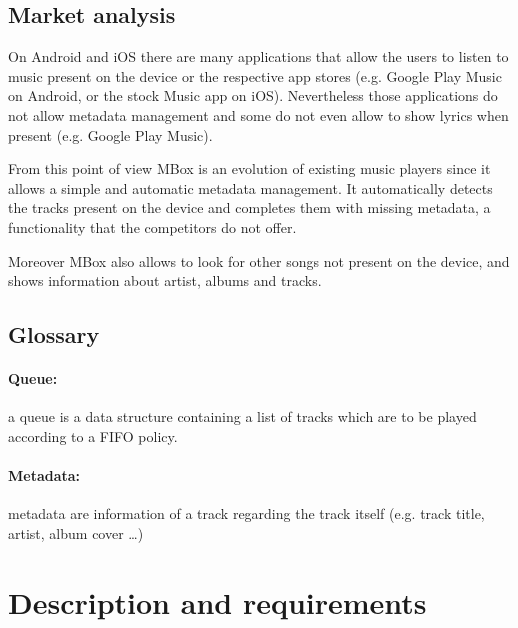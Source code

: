 \documentclass{article}
\begin{document}
\subsection{Market analysis}
On Android and iOS there are many applications that allow the users to listen to
music present on the device or the respective app stores (e.g. Google Play Music
on Android, or the stock Music app on iOS). Nevertheless those applications do
not allow metadata management and some do not even allow to show lyrics when
present (e.g. Google Play Music).

From this point of view MBox is an evolution of existing music players since it
allows a simple and automatic metadata management. It automatically detects the
tracks present on the device and completes them with missing metadata,
a functionality that the competitors do not offer.

Moreover MBox also allows to look for other songs not present on the device, and
shows information about artist, albums and tracks.


\subsection{Glossary}
\paragraph{Queue:} a queue is a data structure containing a list of tracks
which are to be played according to a FIFO policy.
\paragraph{Metadata: } metadata are information of a track regarding the track
itself (e.g. track title, artist, album cover \ldots)

\newpage

\section{Description and requirements}
\end{document}
